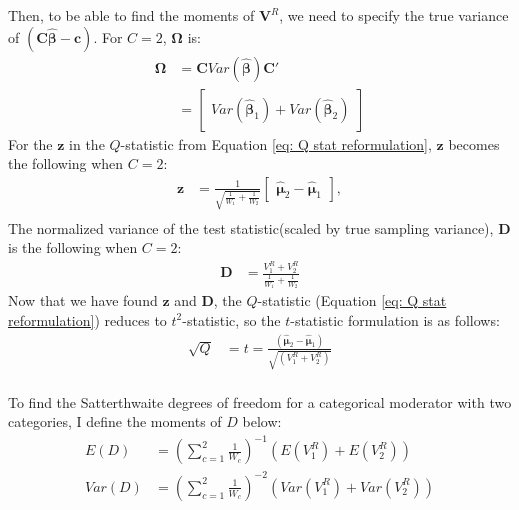  Then, to be able to find the moments of $\mathbf{V}^R$, we need to specify the true variance of $(\mathbf{C}\bm{\hat{\beta}}-\mathbf{c})$. For $C = 2$,  $\mathbf{\Omega}$ is:
 \begin{equation}
     \begin{split}
         \mathbf{\Omega}  &= \mathbf{C}Var(\bm{\hat{\beta}}) \mathbf{C}' \\
    &= \begin{bmatrix}
        Var(\bm{\hat{\beta}}_1) + Var(\bm{\hat{\beta}}_2) 
    \end{bmatrix} 
     \end{split}
     \nonumber
 \end{equation}
For the $\mathbf{z}$ in the $Q$-statistic from Equation \ref{eq: Q stat reformulation}, $\mathbf{z}$ becomes the following when $C=2$: 
 \begin{equation}
    \begin{split}
     \mathbf{z} &= \frac{1}{\sqrt{\frac{1}{W_1} + \frac{1}{W_2}}} \begin{bmatrix}
         \bm{\hat{\mu}}_2 - \bm{\hat{\mu}}_1 
     \end{bmatrix},   \\
    \end{split}
     \nonumber
 \end{equation}
 The normalized variance of the test statistic(scaled by true sampling variance), $\mathbf{D}$ is the following when $C=2$:
 \begin{equation}
    \begin{split}
    \mathbf{D}  & = \frac{V^R_1 + V^R_2 }{\frac{1}{W_1} + \frac{1}{W_2} }
    \end{split} 
    \nonumber
 \end{equation}
Now that we have found $\mathbf{z}$ and $\mathbf{D}$,  the $Q$-statistic (Equation \ref{eq: Q stat reformulation}) reduces to $t^2$-statistic, so the $t$-statistic formulation is as follows:
\begin{equation}
    \begin{split}
         \sqrt{Q} &= t = \frac{\left(\mathbf{\hat{\mu}}_2 - \mathbf{\hat{\mu}}_1  \right)}{\sqrt{\left(V^R_1 + V^R_2 \right)} } \\
    \end{split}
    \nonumber
\end{equation}

To find the Satterthwaite degrees of freedom for a categorical moderator with two categories, I define the moments of $D$ below:
\begin{equation}
    \begin{split}
        E(D) & = \left(\sum_{c=1}^2 \frac{1}{W_c}  \right)^{-1} \left(E(V^R_1) + E(V^R_2)  \right) \\
         Var(D) & = \left(\sum_{c=1}^2 \frac{1}{W_c}  \right)^{-2 } \left(Var(V^R_1) + Var(V^R_2)  \right) \\
    \end{split}
    \nonumber
\end{equation}


